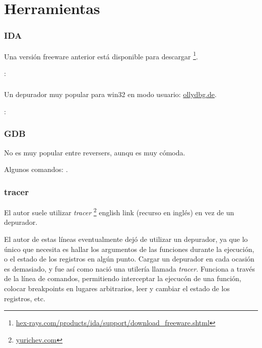 \chapter{Herramientas}


\subsection{IDA}

\label{IDA}
Una versi\'on freeware anterior est\'a disponible para descargar
\footnote{\href{http://www.hex-rays.com/idapro/idadownfreeware.htm}{hex-rays.com/products/ida/support/download\_freeware.shtml}}.

\ShortHotKeyCheatsheet: 


\subsection{\olly}
\myindex{\olly}

Un depurador muy popular para win32 en modo usuario: \href{http://www.ollydbg.de/}{ollydbg.de}.

\ShortHotKeyCheatsheet: 

\subsection{GDB}

No es muy popular entre reversers, aunqu es muy c\'omoda. %

Algunos comandos: .

\subsection{tracer}

\label{tracer}
El autor suele utilizar \emph{tracer}
\footnote{\href{http://yurichev.com/tracer-en.html}{yurichev.com}} english link
(recurso en ingl\'es) en vez de un depurador.%

El autor de estas l\'ineas eventualmente dej\'o de utilizar un depurador, ya que lo \'unico que necesita es hallar los argumentos
de las funciones durante la ejecuci\'on, o el estado de los registros en alg\'un punto.
Cargar un depurador en cada ocasi\'on es demasiado, y fue as\'i como naci\'o una utiler\'ia llamada \emph{tracer}.
Funciona a trav\'es de la l\'inea de comandos, permitiendo interceptar la ejecuc\'on de una funci\'on,
colocar breakpoints en lugares arbitrarios, leer y cambiar el estado de los registros, etc.

